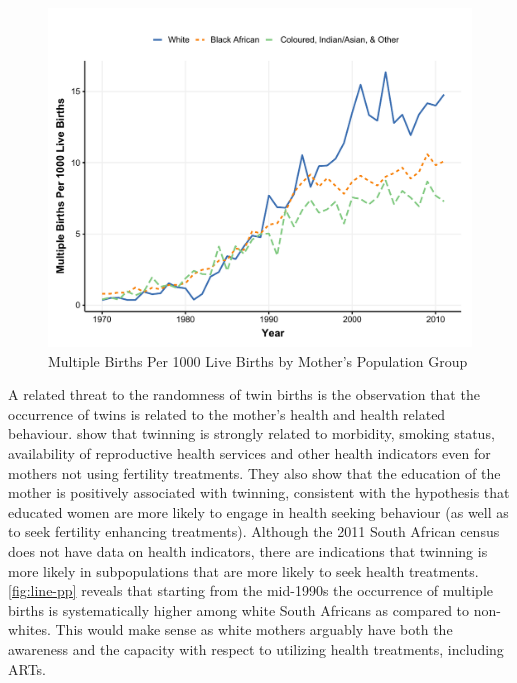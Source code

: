 \begin{figure}[!th]
\centering
\caption{\label{fig:line-pp}Multiple Births Per 1000 Live Births by Mother's Population Group}
\includegraphics[width=\textwidth]{figures/line_pp.pdf}
\end{figure}

A related threat to the randomness of twin births is the observation that the occurrence of twins is related to the mother's health and health related behaviour. \textcite{bhalotra_twin_2019} show that twinning is strongly related to morbidity, smoking status, availability of reproductive health services and other health indicators even for mothers not using fertility treatments. They also show that the education of the mother is positively associated with twinning, consistent with the hypothesis that educated women are more likely to engage in health seeking behaviour (as well as to seek fertility enhancing treatments). Although the 2011 South African census does not have data on health indicators, there are indications that twinning is more likely in subpopulations that are more likely to seek health treatments. \autoref{fig:line-pp} reveals that starting from the mid-1990s the occurrence of multiple births is systematically higher among white South Africans as compared to non-whites. This would make sense as white mothers arguably have both the awareness and the capacity with respect to utilizing health treatments, including ARTs. 

 

